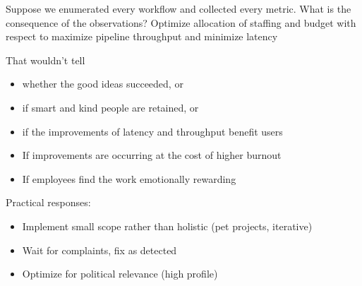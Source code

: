 Suppose we enumerated every workflow and collected every metric.
What is the consequence of the observations?
Optimize allocation of staffing and budget with respect to maximize pipeline throughput and minimize latency 

That wouldn't tell 
\begin{itemize}
    \item whether the good ideas succeeded, or
    \item if smart and kind people are retained, or
    \item if the improvements of latency and throughput benefit users
    \item If improvements are occurring at the cost of higher burnout
    \item If employees find the work emotionally rewarding 
\end{itemize}


Practical responses: 
\begin{itemize}
    \item Implement small scope rather than holistic (pet projects, iterative)
    \item Wait for complaints, fix as detected 
    \item Optimize for political relevance (high profile)
\end{itemize}
